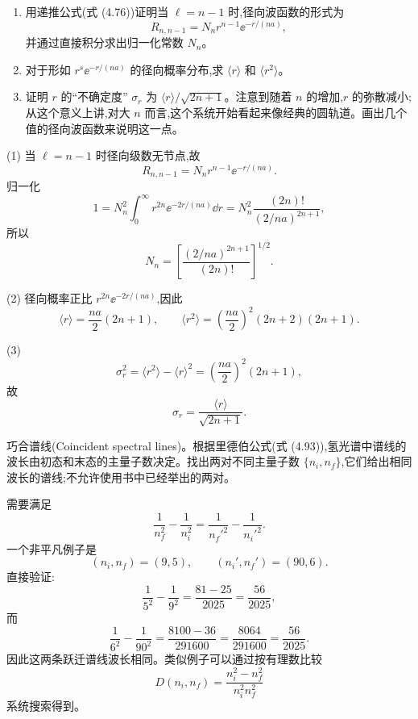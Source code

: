 \begin{question}
\begin{enumerate}
\item 用递推公式(式 (4.76))证明当 $\ell=n-1$ 时,径向波函数的形式为
\[
R_{n,n-1}=N_n r^{n-1}\ee^{-r/(na)},
\]
并通过直接积分求出归一化常数 $N_n$。
\item 对于形如 $r^s \ee^{-r/(na)}$ 的径向概率分布,求 $\langle r\rangle$ 和 $\langle r^2\rangle$。
\item 证明 $r$ 的“不确定度” $\sigma_r$ 为 $\langle r\rangle/\sqrt{2n+1}$。注意到随着 $n$ 的增加,$r$ 的弥散减小;从这个意义上讲,对大 $n$ 而言,这个系统开始看起来像经典的圆轨道。画出几个值的径向波函数来说明这一点。
\end{enumerate}

\par\smallskip
{}

\begin{solution}

(1) 当 $\ell=n-1$ 时径向级数无节点,故
\[
R_{n,n-1}=N_nr^{n-1}\ee^{-r/(na)}.
\]
归一化
\[
1=N_n^2\int_0^\infty r^{2n}\ee^{-2r/(na)}\dd r
=N_n^2\frac{(2n)!}{(2/na)^{2n+1}},
\]
所以
\[
N_n=\left[\frac{(2/na)^{2n+1}}{(2n)!}\right]^{1/2}.
\]

(2) 径向概率正比 $r^{2n}\ee^{-2r/(na)}$,因此
\[
\langle r\rangle=\frac{na}{2}(2n+1),
\qquad
\langle r^2\rangle=\left(\frac{na}{2}\right)^2(2n+2)(2n+1).
\]

(3) 
\[
\sigma_r^2=\langle r^2\rangle-\langle r\rangle^2=\left(\frac{na}{2}\right)^2(2n+1),
\]
故
\[
\sigma_r=\frac{\langle r\rangle}{\sqrt{2n+1}}.
\]

\end{solution}
\end{question}

\begin{question}
巧合谱线(Coincident spectral lines)。根据里德伯公式(式 (4.93)),氢光谱中谱线的波长由初态和末态的主量子数决定。找出两对不同主量子数 $\{n_i,n_f\}$,它们给出相同波长的谱线;不允许使用书中已经举出的两对。

\par\smallskip
{}

\begin{solution}


需要满足
\[
\frac1{n_f^2}-\frac1{n_i^2}=\frac1{{n_f'}^2}-\frac1{{n_i'}^2}.
\]
一个非平凡例子是
\[
(n_i,n_f)=(9,5),\qquad (n_i',n_f')=(90,6).
\]
直接验证:
\[
\frac1{5^2}-\frac1{9^2}=\frac{81-25}{2025}=\frac{56}{2025},
\]
而
\[
\frac1{6^2}-\frac1{90^2}=\frac{8100-36}{291600}=\frac{8064}{291600}=\frac{56}{2025}.
\]
因此这两条跃迁谱线波长相同。类似例子可以通过按有理数比较
\[
D(n_i,n_f)=\frac{n_i^2-n_f^2}{n_i^2n_f^2}
\]
系统搜索得到。


\end{solution}
\end{question}

